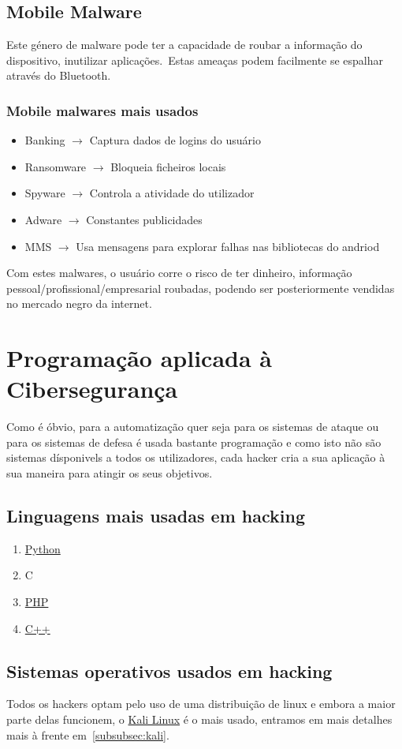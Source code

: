 \documentclass{report}
\begin{document}
\subsection{Mobile Malware}
Este género de malware pode ter a capacidade de roubar a informação do dispositivo, inutilizar aplicações.\ Estas ameaças podem facilmente se espalhar através do Bluetooth.
\subsubsection{Mobile malwares mais usados} {
\begin{itemize}
    \item Banking $\rightarrow$ Captura dados de logins do usuário
    \item Ransomware $\rightarrow$ Bloqueia ficheiros locais
    \item Spyware $\rightarrow$ Controla a atividade do utilizador
    \item Adware $\rightarrow$ Constantes publicidades
    \item MMS $\rightarrow$ Usa mensagens para explorar falhas nas bibliotecas do andriod
\end{itemize}
}
Com estes malwares, o usuário corre o risco de ter dinheiro, informação pessoal/profissional/empresarial roubadas, podendo ser posteriormente vendidas no mercado negro da internet.
\pagebreak
\section{Programação aplicada à Cibersegurança}
Como é óbvio, para a automatização quer seja para os sistemas de ataque ou para os sistemas de defesa é usada bastante programação e como isto não são sistemas dísponivels a todos os utilizadores, cada hacker cria a sua aplicação à sua maneira para atingir os seus objetivos.
\subsection{Linguagens mais usadas em hacking}
\begin{enumerate}
    \item \href{https://www.python.org/}{Python}
    \item C
    \item \href{https://www.php.net/}{PHP}
    \item \href{https://cplusplus.com/}{C++}
\end{enumerate}
\subsection{Sistemas operativos usados em hacking}
Todos os hackers optam pelo uso de uma distribuição de linux e embora a maior parte delas funcionem, o \href{https://www.kali.org/}{Kali Linux} é o mais usado, entramos em mais detalhes mais à frente em~\ref{subsubsec:kali}.
\end{document}
